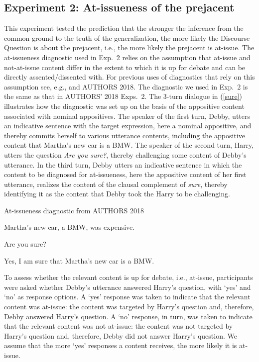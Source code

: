 \documentclass[11pt,fleqn]{article}
\newcommand{\6}{\mbox{$[\hspace*{-.6mm}[$}}
\newcommand{\9}{\mbox{$]\hspace*{-.6mm}]$}}
\begin{document}
\subsection{Experiment 2: At-issueness of the prejacent}\label{s32}

This experiment tested the prediction that the stronger the inference from the common ground to the truth of the generalization, the more likely the Discourse Question is about the prejacent, i.e., the more likely the prejacent is at-issue. The at-issueness diagnostic used in Exp.~2 relies on the assumption that at-issue and not-at-issue content differ in the extent to which it is up for debate and can be directly assented/dissented with. For previous uses of diagnostics that rely on this assumption see, e.g., \citealt{amaral-etal07,xue-onea11,murray2014,anderbois-etal2015,destruel-etal2015,tonhauser-sula6,syrett-koev2015} and AUTHORS 2018. The diagnostic we used in Exp.~2 is the same as that in AUTHORS' 2018 Exps.~2. The 3-turn dialogue in (\ref{sure}) illustrates how the diagnostic was set up on the basis of the appositive content associated with nominal appositives. The speaker of the first turn, Debby, utters an indicative sentence with the target expression, here a nominal appositive, and thereby commits herself to various utterance contents, including the appositive content that Martha's new car is a BMW. The speaker of the second turn, Harry, utters the question {\em Are you sure?}, thereby challenging some content of Debby's utterance. In the third turn, Debby utters an indicative sentence in which the content to be diagnosed for at-issueness, here the appositive content of her first utterance, realizes the content of the clausal complement of {\em sure}, thereby identifying it as the content that Debby took the Harry to be challenging. 

\begin{exe}
\ex\label{sure} At-issueness diagnostic from AUTHORS 2018
\begin{xlist}
 Martha's new car, a BMW, was expensive.

 Are you sure?
	
 Yes, I am sure that Martha's new car is a BMW. 
\end{xlist}
\end{exe}

To assess whether the relevant content is up for debate, i.e., at-issue, participants were asked whether Debby's utterance answered Harry's question, with `yes' and `no' as response options. A `yes' response was taken to indicate that the relevant content was at-issue: the content was targeted by Harry's question and, therefore, Debby answered Harry's question. A `no' response, in turn, was taken to indicate that the relevant content was not at-issue: the content was not targeted by Harry's question and, therefore, Debby did not answer Harry's question. We assume that the more `yes' responses a content receives, the more likely it is at-issue.
\end{document}

